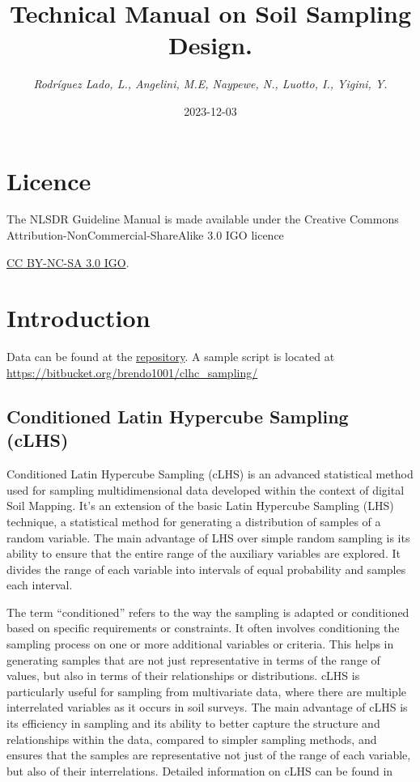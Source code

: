 \documentclass[
]{book}
\title{Technical Manual on Soil Sampling Design.}
\author{\emph{Rodríguez Lado, L., Angelini, M.E, Naypewe, N., Luotto, I., Yigini, Y.}}
\date{2023-12-03}
\begin{document}
\maketitle

{
\setcounter{tocdepth}{1}
\tableofcontents
}
\hypertarget{licence}{%
\chapter*{Licence}\label{licence}}

The NLSDR Guideline Manual is made available under the Creative Commons Attribution-NonCommercial-ShareAlike 3.0 IGO licence

\href{https://creativecommons.org/licenses/by-nc-sa/3.0/igo/legalcode}{CC BY-NC-SA 3.0 IGO}.

\hypertarget{introduction}{%
\chapter{Introduction}\label{introduction}}

Data can be found at the \href{https://bitbucket.org/brendo1001/clhc_sampling/src/master/}{repository}. A sample script is located at \url{https://bitbucket.org/brendo1001/clhc_sampling/}

\hypertarget{conditioned-latin-hypercube-sampling-clhs}{%
\section*{Conditioned Latin Hypercube Sampling (cLHS)}\label{conditioned-latin-hypercube-sampling-clhs}}

Conditioned Latin Hypercube Sampling (cLHS) is an advanced statistical method used for sampling multidimensional data developed within the context of digital Soil Mapping. It's an extension of the basic Latin Hypercube Sampling (LHS) technique, a statistical method for generating a distribution of samples of a random variable. The main advantage of LHS over simple random sampling is its ability to ensure that the entire range of the auxiliary variables are explored. It divides the range of each variable into intervals of equal probability and samples each interval.

The term ``conditioned'' refers to the way the sampling is adapted or conditioned based on specific requirements or constraints. It often involves conditioning the sampling process on one or more additional variables or criteria. This helps in generating samples that are not just representative in terms of the range of values, but also in terms of their relationships or distributions. cLHS is particularly useful for sampling from multivariate data, where there are multiple interrelated variables as it occurs in soil surveys. The main advantage of cLHS is its efficiency in sampling and its ability to better capture the structure and relationships within the data, compared to simpler sampling methods, and ensures that the samples are representative not just of the range of each variable, but also of their interrelations. Detailed information on cLHS can be found in \citep{minasny2006}
\end{document}
